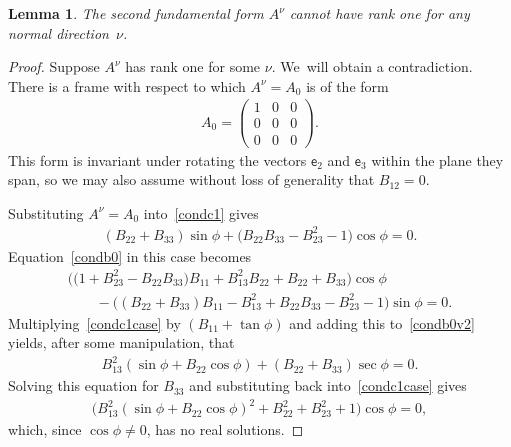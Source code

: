 \documentclass[pdftex]{sigma}
\def\ve{\mathsf{e}}
\newtheorem{Lemma}[Theorem]{Lemma}
\numberwithin{equation}{section}
\begin{document}
\begin{Lemma} \label{no-rank-one}
The second fundamental form $A^{\nu}$ cannot have rank one for any normal direc\-tion~$\nu$.
\end{Lemma}
\begin{proof}
Suppose $A^{\nu}$ has rank one for some $\nu$. We~will obtain a contradiction. There is a frame with respect to which $A^{\nu} = A_0$ is of the form
\begin{gather*}
A_0 = \begin{pmatrix} 1 & 0 & 0 \\ 0 & 0 & 0 \\ 0 & 0 & 0 \end{pmatrix}.
\end{gather*}
This form is invariant under rotating the vectors $\ve_2$ and $\ve_3$ within the plane they span, so we may also assume without loss of generality that $B_{12} = 0$.

Substituting $A^\nu = A_0$ into~\eqref{condc1} gives
\begin{gather} \label{condc1case}
(B_{22} + B_{33}) \sin\phi + \big(B_{22}B_{33}-B_{23}^2-1\big) \cos\phi = 0.
\end{gather}
Equation~\eqref{condb0} in this case becomes
\begin{gather}
\big( \big(1 + B_{23}^2 - B_{22}B_{33}\big) B_{11} + B_{13}^2 B_{22} + B_{22} + B_{33} \big) \cos \phi \nonumber
\\ \qquad
{} - \big( (B_{22} + B_{33}) B_{11} - B_{13}^2 + B_{22}B_{33} - B_{23}^2 - 1 \big) \sin \phi = 0.
 \label{condb0v2}\end{gather}
Multiplying~\eqref{condc1case} by $(B_{11} + \tan \phi)$ and adding this to~\eqref{condb0v2} yields, after some manipulation, that
\begin{gather*}
B_{13}^2 (\sin \phi + B_{22}\cos\phi) + (B_{22} + B_{33})\sec\phi = 0.
\end{gather*}
Solving this equation for $B_{33}$ and substituting back into~\eqref{condc1case} gives
\begin{gather*}
\big( B_{13}^2 (\sin \phi + B_{22}\cos\phi)^2 + B_{22}^2 + B_{23}^2 + 1\big) \cos\phi = 0,
\end{gather*}
which, since $\cos\phi \ne 0$, has no real solutions.
\end{proof}
\end{document}

